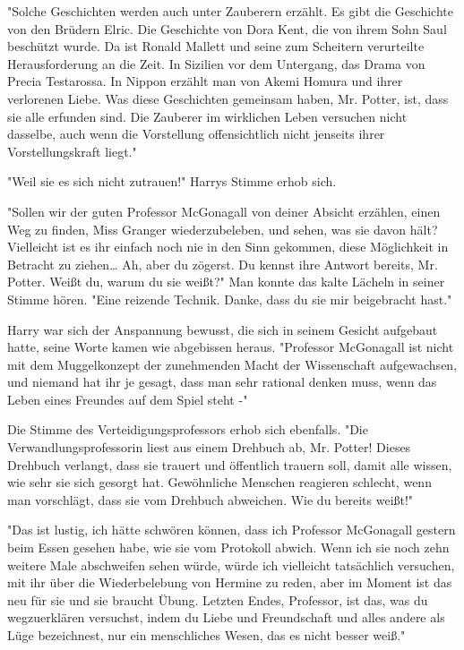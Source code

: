 {"Solche Geschichten werden auch unter Zauberern erzählt. Es gibt die Geschichte von den Brüdern Elric. Die Geschichte von Dora Kent, die von ihrem Sohn Saul beschützt wurde. Da ist Ronald Mallett und seine zum Scheitern verurteilte Herausforderung an die Zeit. In Sizilien vor dem Untergang, das Drama von Precia Testarossa. In Nippon erzählt man von Akemi Homura und ihrer verlorenen Liebe. Was diese Geschichten gemeinsam haben, Mr. Potter, ist, dass sie alle erfunden sind. Die Zauberer im wirklichen Leben versuchen nicht dasselbe, auch wenn die Vorstellung offensichtlich nicht jenseits ihrer Vorstellungskraft liegt."

"Weil sie es sich nicht zutrauen!" Harrys Stimme erhob sich.

"Sollen wir der guten Professor McGonagall von deiner Absicht erzählen, einen Weg zu finden, Miss Granger wiederzubeleben, und sehen, was sie davon hält? Vielleicht ist es ihr einfach noch nie in den Sinn gekommen, diese Möglichkeit in Betracht zu ziehen… Ah, aber du zögerst. Du kennst ihre Antwort bereits, Mr. Potter. Weißt du, warum du sie weißt?" Man konnte das kalte Lächeln in seiner Stimme hören. "Eine reizende Technik. Danke, dass du sie mir beigebracht hast."

Harry war sich der Anspannung bewusst, die sich in seinem Gesicht aufgebaut hatte, seine Worte kamen wie abgebissen heraus. "Professor McGonagall ist nicht mit dem Muggelkonzept der zunehmenden Macht der Wissenschaft aufgewachsen, und niemand hat ihr je gesagt, dass man sehr rational denken muss, wenn das Leben eines Freundes auf dem Spiel steht -"

Die Stimme des Verteidigungsprofessors erhob sich ebenfalls. "Die Verwandlungsprofessorin liest aus einem Drehbuch ab, Mr. Potter! Dieses Drehbuch verlangt, dass sie trauert und öffentlich trauern soll, damit alle wissen, wie sehr sie sich gesorgt hat. Gewöhnliche Menschen reagieren schlecht, wenn man vorschlägt, dass sie vom Drehbuch abweichen. Wie du bereits weißt!"

"Das ist lustig, ich hätte schwören können, dass ich Professor McGonagall gestern beim Essen gesehen habe, wie sie vom Protokoll abwich. Wenn ich sie noch zehn weitere Male abschweifen sehen würde, würde ich vielleicht tatsächlich versuchen, mit ihr über die Wiederbelebung von Hermine zu reden, aber im Moment ist das neu für sie und sie braucht Übung. Letzten Endes, Professor, ist das, was du wegzuerklären versuchst, indem du Liebe und Freundschaft und alles andere als Lüge bezeichnest, nur ein menschliches Wesen, das es nicht besser weiß."

}
